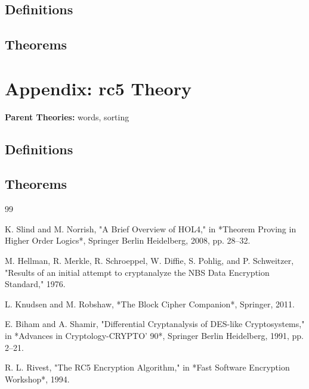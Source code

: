 \documentclass{article}
\begin{document}

\subsection{Definitions}

\HOLdesXXpropDefinitions

\subsection{Theorems}

\HOLdesXXpropTheorems

\section{Appendix: rc5 Theory}
\begin{flushleft}
\textbf{Parent Theories:} words, sorting
\end{flushleft}


\subsection{Definitions}

\HOLrcFiveDefinitions

\subsection{Theorems}

\HOLrcFiveTheorems
\begin{thebibliography}{99}

K. Slind and M. Norrish, "A Brief Overview of HOL4," in *Theorem Proving in Higher Order Logics*, Springer Berlin Heidelberg, 2008, pp. 28--32.

M. Hellman, R. Merkle, R. Schroeppel, W. Diffie, S. Pohlig, and P. Schweitzer, "Results of an initial attempt to cryptanalyze the NBS Data Encryption Standard," 1976.

L. Knudsen and M. Robshaw, *The Block Cipher Companion*, Springer, 2011.

E. Biham and A. Shamir, "Differential Cryptanalysis of DES-like Cryptosystems," in *Advances in Cryptology-CRYPTO' 90*, Springer Berlin Heidelberg, 1991, pp. 2--21.

R. L. Rivest, "The RC5 Encryption Algorithm," in *Fast Software Encryption Workshop*, 1994.

\end{thebibliography}
\end{document}
